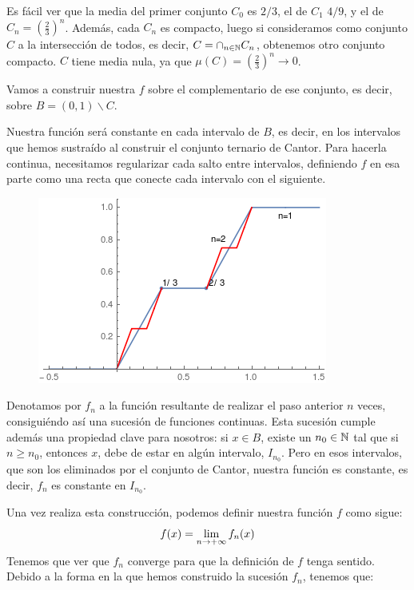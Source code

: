 Es fácil ver que la media del primer conjunto $C_0$ es $2/3$, el de $C_1$ $4/9$, y el de $C_n=(\frac{2}{3})^n$. Además, cada $C_n$ es compacto, luego si consideramos como conjunto $C$ a la intersección de todos, es decir, $C=\cap_{n\in\mathbb{N}} C_n$, obtenemos otro conjunto compacto. $C$ tiene media nula, ya que $\mu(C)=\left(\frac{2}{3}\right)^n\to0$.

Vamos a construir nuestra $f$ sobre el complementario de ese conjunto, es decir, sobre $B=(0,1)\backslash C$.

Nuestra función será constante en cada intervalo de $B$, es decir, en los intervalos que hemos sustraído al construir el conjunto ternario de Cantor. Para hacerla continua, necesitamos regularizar cada salto entre intervalos, definiendo $f$ en esa parte como una recta que conecte cada intervalo con el siguiente.

\begin{figure}[H]
   \center
  \includegraphics[scale=0.6]{img/escalera.png}
\end{figure}

Denotamos por $f_n$ a la función resultante de realizar el paso anterior $n$ veces, consiguiéndo así una sucesión de funciones continuas. Esta sucesión cumple además una propiedad clave para nosotros: si $x\in B$, existe un $n_0\in\mathbb{N}$ tal que si $n\geq n_0$, entonces $x$, debe de estar en algún intervalo, $I_{n_0}$. Pero en esos intervalos, que son los eliminados por el conjunto de Cantor, nuestra función es constante, es decir, $f_n$ es constante en $I_{n_0}$.

Una vez realiza esta construcción, podemos definir nuestra función $f$ como sigue:
\[
f(x)=\displaystyle\lim_{  n  \to +\infty }  f_n(x) 
\]
Tenemos que ver que $f_n$ converge para que la definición de $f$ tenga sentido. Debido a la forma en la que hemos construido la sucesión $f_n$, tenemos que:

